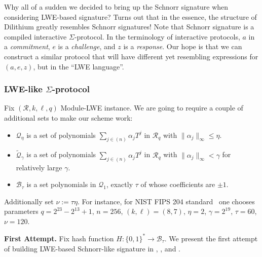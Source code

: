 \documentclass{template}
\begin{document}
Why all of a sudden we decided to bring up the Schnorr signature when
considering LWE-based signature? Turns out that in the essence, the structure of
Dilithium greatly resembles Schnorr signatures! Note that Schnorr signature is a
compiled interactive $\Sigma$-protocol. In the terminology of interactive
protocols, $a$ in a \textit{commitment}, $e$ is a \textit{challenge}, and $z$ is
a \textit{response}. Our hope is that we can construct a similar protocol that
will have different yet resembling expressions for $(a,e,z)$, but in the ``LWE
language''.

\subsubsection{LWE-like $\Sigma$-protocol}\label{section:lwe-sigma}

Fix $(\mathcal{R},k,\ell,q)$ Module-LWE instance. We are going to require a
couple of additional sets to make our scheme work: 
\begin{itemize}
    \item $\mathcal{Q}_{\eta}$ is a set of polynomials $\sum_{j \in (n)}\alpha_jT^j$ in $\mathcal{R}_q$ with $\|\alpha_j\|_{\infty} \leq \eta$.
    \item $\widetilde{\mathcal{Q}}_{\gamma}$ is a set of polynomials $\sum_{j \in
    (n)}\alpha_jT^j$ in $\mathcal{R}_q$ with $\|\alpha_j\|_{\infty} < \gamma$
    for relatively large $\gamma$.
    \item $\mathcal{B}_{\tau}$ is a set polynomials in $\mathcal{Q}_1$, exactly $\tau$
    of whose coefficients are $\pm 1$.
\end{itemize}

Additionally set $\nu := \tau\eta$. For instance, for NIST FIPS 204
standard~\cite{fips-204} one chooses parameters $q=2^{23}-2^{13}+1$, $n=256$,
$(k,\ell)=(8,7)$, $\eta=2$, $\gamma=2^{19}$, $\tau=60$, $\nu = 120$. 

\textbf{First Attempt.} Fix hash function $H: \{0,1\}^* \to \mathcal{B}_{\tau}$.
We present the first attempt of building LWE-based Schnorr-like signature in
, , and
.
\end{document}

